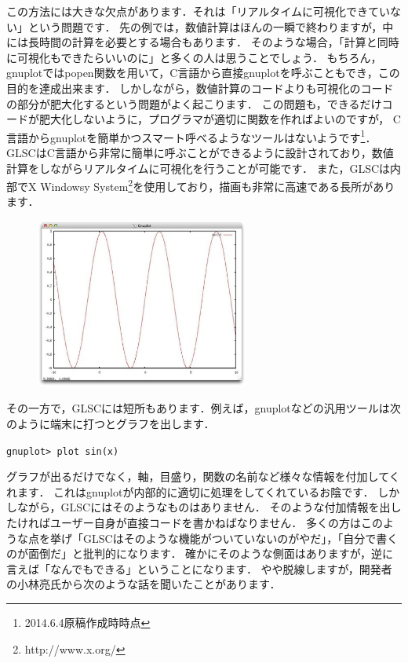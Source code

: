 \documentclass[platex,a4paper,12pt]{jsarticle}%
\begin{document}
この方法には大きな欠点があります．それは「リアルタイムに可視化できていない」という問題です．
先の例では，数値計算はほんの一瞬で終わりますが，中には長時間の計算を必要とする場合もあります．
そのような場合，「計算と同時に可視化もできたらいいのに」と多くの人は思うことでしょう．
もちろん，gnuplotではpopen関数を用いて，C言語から直接gnuplotを呼ぶこともでき，この目的を達成出来ます．
しかしながら，数値計算のコードよりも可視化のコードの部分が肥大化するという問題がよく起こります．
この問題も，できるだけコードが肥大化しないように，プログラマが適切に関数を作ればよいのですが，
C言語からgnuplotを簡単かつスマート呼べるようなツールはないようです\footnote{2014.6.4原稿作成時時点}．
GLSCはC言語から非常に簡単に呼ぶことができるように設計されており，数値計算をしながらリアルタイムに可視化を行うことが可能です．
また，GLSCは内部でX Windowsy System\footnote{http://www.x.org/}を使用しており，描画も非常に高速である長所があります．

\begin{figure}
\vspace{-1\baselineskip}
	\includegraphics[width=70mm]{001.eps}
\end{figure}

その一方で，GLSCには短所もあります．例えば，gnuplotなどの汎用ツールは次のように端末に打つとグラフを出します．

\noindent
\verb|gnuplot> plot sin(x)|

\noindent
グラフが出るだけでなく，軸，目盛り，関数の名前など様々な情報を付加してくれます．
これはgnuplotが内部的に適切に処理をしてくれているお陰です．
しかしながら，GLSCにはそのようなものはありません．
そのような付加情報を出したければユーザー自身が直接コードを書かねばなりません．
多くの方はこのような点を挙げ「GLSCはそのような機能がついていないのがやだ」，「自分で書くのが面倒だ」と批判的になります．
確かにそのような側面はありますが，逆に言えば「なんでもできる」ということになります．
やや脱線しますが，開発者の小林亮氏から次のような話を聞いたことがあります．
\end{document}
